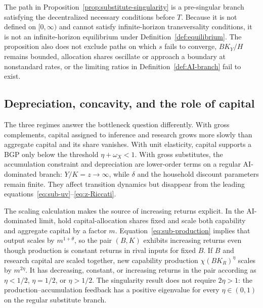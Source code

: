 \begin{remark}
The path in Proposition~\ref{prop:substitute-singularity} is a pre-singular branch satisfying the decentralized necessary conditions before $T$. Because it is not defined on $[0,\infty)$ and cannot satisfy infinite-horizon transversality conditions, it is not an infinite-horizon equilibrium under Definition~\ref{def:equilibrium}. The proposition also does not exclude paths on which $s$ fails to converge, $BK_Y/H$ remains bounded, allocation shares oscillate or approach a boundary at nonstandard rates, or the limiting ratios in Definition~\ref{def:AI-branch} fail to exist.
\end{remark}

\subsection{Depreciation, concavity, and the role of capital}

The three regimes answer the bottleneck question differently. With gross complements, capital assigned to inference and research grows more slowly than aggregate capital and its share vanishes. With unit elasticity, capital supports a BGP only below the threshold $\eta+\omega_X<1$. With gross substitutes, the accumulation constraint and depreciation are lower-order terms on a regular AI-dominated branch: $Y/K=z\to\infty$, while $\delta$ and the household discount parameters remain finite. They affect transition dynamics but disappear from the leading equations~\eqref{eq:sub-uv}--\eqref{eq:z-Riccati}.

The scaling calculation makes the source of increasing returns explicit. In the AI-dominated limit, hold capital-allocation shares fixed and scale both capability and aggregate capital by a factor $m$. Equation~\eqref{eq:sub-production} implies that output scales by $m^{1+\theta}$, so the pair $(B,K)$ exhibits increasing returns even though production is constant returns in rival inputs for fixed $B$. If $B$ and research capital are scaled together, new capability production $\chi(BK_R)^\eta$ scales by $m^{2\eta}$. It has decreasing, constant, or increasing returns in the pair according as $\eta<1/2$, $\eta=1/2$, or $\eta>1/2$. The singularity result does not require $2\eta>1$: the production--accumulation feedback has a positive eigenvalue for every $\eta\in(0,1)$ on the regular substitute branch.

